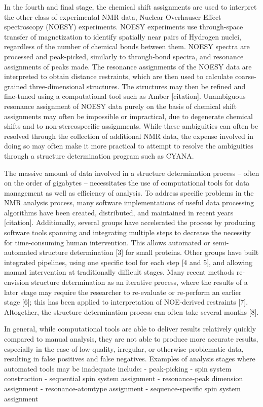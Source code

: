 \documentclass[a4paper]{report}
\begin{document}
In the fourth and final stage, the chemical shift assignments are used to interpret the other class of experimental NMR data, Nuclear Overhauser Effect spectroscopy (NOESY) experiments.  NOESY experiments use through-space transfer of magnetization to identify spatially near pairs of Hydrogen nuclei, regardless of the number of chemical bonds between them.  NOESY spectra are processed and peak-picked, similarly to through-bond spectra, and resonance assignments of peaks made.  The resonance assignments of the NOESY data are interpreted to obtain distance restraints, which are then used to calculate coarse-grained three-dimensional structures.  The structures may then be refined and fine-tuned using a computational tool such as Amber [citation].  Unambiguous resonance assignment of NOESY data purely on the basis of chemical shift assignments may often be impossible or impractical, due to degenerate chemical shifts and to non-stereospecific assignments.  While these ambiguities can often be resolved through the collection of additional NMR data, the expense involved in doing so may often make it more practical to attempt to resolve the ambiguities through a structure determination program such as CYANA.

The massive amount of data involved in a structure determination process -- often on the order of gigabytes -- necessitates the use of computational tools for data management as well as efficiency of analysis.  To address specific problems in the NMR analysis process, many software implementations of useful data processing algorithms have been created, distributed, and maintained in recent years [citation].  Additionally, several groups have accelerated the process by producing software tools spanning and integrating multiple steps to decrease the necessity for time-consuming human intervention.  This allows automated or semi-automated structure determination [3] for small proteins.  Other groups have built integrated pipelines, using one specific tool for each step [4 and 5], and allowing manual intervention at traditionally difficult stages.  Many recent methods re-envision structure determination as an iterative process, where the results of a later stage may require the researcher to re-evaluate or re-perform an earlier stage [6]; this has been applied to interpretation of NOE-derived restraints [7].  Altogether, the structure determination process can often take several months [8].

In general, while computational tools are able to deliver results relatively quickly compared to manual analysis, they are not able to produce more accurate results, especially in the case of low-quality, irregular, or otherwise problematic data, resulting in false positives and false negatives.  Examples of analysis stages where automated tools may be inadequate include:
 - peak-picking
 - spin system construction
 - sequential spin system assignment
 - resonance-peak dimension assignment
 - resonance-atomtype assignment
 - sequence-specific spin system assignment
\end{document}
